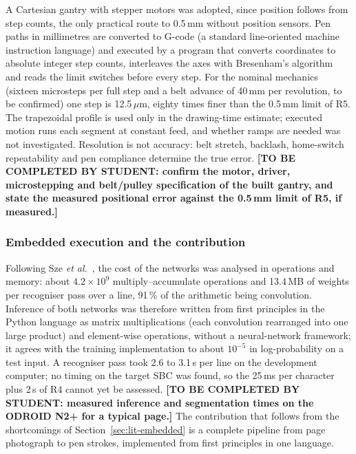 A Cartesian gantry with stepper motors was adopted, since position follows from step counts, the only practical route to 0.5\,mm without position sensors. Pen paths in millimetres are converted to G-code (a standard line-oriented machine instruction language) and executed by a program that converts coordinates to absolute integer step counts, interleaves the axes with Bresenham's algorithm~\cite{bresenham1965} and reads the limit switches before every step. For the nominal mechanics (sixteen microsteps per full step and a belt advance of 40\,mm per revolution, to be confirmed) one step is 12.5\,$\mu$m, eighty times finer than the 0.5\,mm limit of R5. The trapezoidal profile is used only in the drawing-time estimate; executed motion runs each segment at constant feed, and whether ramps are needed was not investigated. Resolution is not accuracy: belt stretch, backlash, home-switch repeatability and pen compliance determine the true error. \textbf{[TO BE COMPLETED BY STUDENT: confirm the motor, driver, microstepping and belt/pulley specification of the built gantry, and state the measured positional error against the 0.5\,mm limit of R5, if measured.]}

\subsubsection{Embedded execution and the contribution}

Following Sze \emph{et al.}~\cite{sze2017}, the cost of the networks was analysed in operations and memory: about $4.2\times10^{9}$ multiply--accumulate operations and 13.4\,MB of weights per recogniser pass over a line, 91\,\% of the arithmetic being convolution. Inference of both networks was therefore written from first principles in the Python language as matrix multiplications (each convolution rearranged into one large product) and element-wise operations, without a neural-network framework; it agrees with the training implementation to about $10^{-5}$ in log-probability on a test input. A recogniser pass took 2.6 to 3.1\,s per line on the development computer; no timing on the target SBC was found, so the 25\,ms per character plus 2\,s of R4 cannot yet be assessed. \textbf{[TO BE COMPLETED BY STUDENT: measured inference and segmentation times on the ODROID N2+ for a typical page.]} The contribution that follows from the shortcomings of Section~\ref{sec:lit-embedded} is a complete pipeline from page photograph to pen strokes, implemented from first principles in one language.
